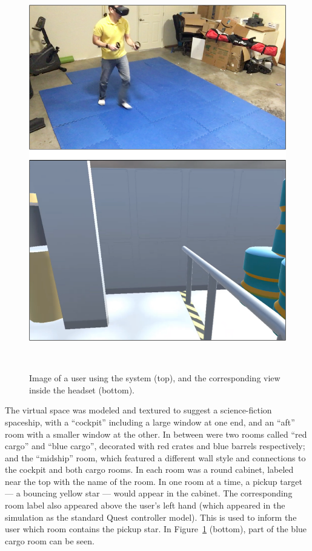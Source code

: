 \documentclass{sigchi}
\begin{document}
\begin{figure}[htb]
  \centering
  \includegraphics[width=1\columnwidth]{figures/LabSpace.pdf}
  \caption{Image of a user using the system (top), and the corresponding view inside the headset (bottom).}~\label{fig:labSpace}
\end{figure}

The virtual space was modeled and textured to suggest a science-fiction spaceship, with a “cockpit” including a large window at one end, and an “aft” room with a smaller window at the other.  In between were two rooms called “red cargo” and “blue cargo”, decorated with red crates and blue barrels respectively; and the “midship” room, which featured a different wall style and connections to the cockpit and both cargo rooms.  In each room was a round cabinet, labeled near the top with the name of the room.  In one room at a time, a pickup target — a bouncing yellow star — would appear in the cabinet.  The corresponding room label also appeared above the user’s left hand (which appeared in the simulation as the standard Quest controller model).  This is used to inform the user which room contains the pickup star.  In Figure~\ref{fig:labSpace} (bottom), part of the blue cargo room can be seen.
\end{document}
